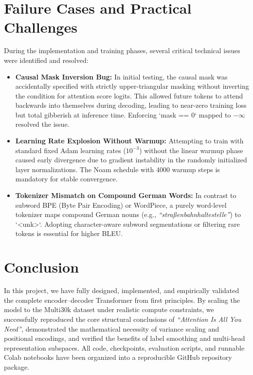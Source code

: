\documentclass[conference]{IEEEtran}
\begin{document}
\section{Failure Cases and Practical Challenges}
During the implementation and training phases, several critical technical issues were identified and resolved:
\begin{itemize}
    \item \textbf{Causal Mask Inversion Bug:} In initial testing, the causal mask was accidentally specified with strictly upper-triangular masking without inverting the condition for attention score logits. This allowed future tokens to attend backwards into themselves during decoding, leading to near-zero training loss but total gibberish at inference time. Enforcing `mask == 0` mapped to $-\infty$ resolved the issue.
    \item \textbf{Learning Rate Explosion Without Warmup:} Attempting to train with standard fixed Adam learning rates ($10^{-3}$) without the linear warmup phase caused early divergence due to gradient instability in the randomly initialized layer normalizations. The Noam schedule with 4000 warmup steps is mandatory for stable convergence.
    \item \textbf{Tokenizer Mismatch on Compound German Words:} In contrast to subword BPE (Byte Pair Encoding) or WordPiece, a purely word-level tokenizer maps compound German nouns (e.g., \textit{``straßenbahnhaltestelle''}) to `<unk>`. Adopting character-aware subword segmentations or filtering rare tokens is essential for higher BLEU.
\end{itemize}

\section{Conclusion}
In this project, we have fully designed, implemented, and empirically validated the complete encoder--decoder Transformer from first principles. By scaling the model to the Multi30k dataset under realistic compute constraints, we successfully reproduced the core structural conclusions of \textit{``Attention Is All You Need''}, demonstrated the mathematical necessity of variance scaling and positional encodings, and verified the benefits of label smoothing and multi-head representation subspaces. All code, checkpoints, evaluation scripts, and runnable Colab notebooks have been organized into a reproducible GitHub repository package.



\end{document}
